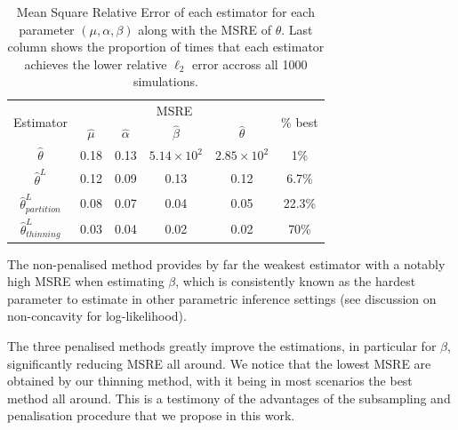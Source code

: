    \begin{table}[!ht]
        \begin{center}  
            \centering
            \begin{tabular}{c|cccc|c}
                \multirow{2}{*}{Estimator} & \multicolumn{4}{c|}{MSRE} & \multirow{2}{*}{$\%$ best}\\
                & $\hat \mu$ & $\hat \alpha$ & $\hat \beta$ & $\hat \theta$ \\
                \midrule
                $\hat \theta$ & 0.18 & 0.13 & $5.14 \times 10^{2}$ & $2.85\times 10^{2}$ & 1\%\\
                $\hat \theta^L$ & 0.12 & 0.09 & 0.13 & 0.12 & 6.7\%\\
                $\hat \theta^L_{partition}$ & 0.08 & 0.07 & 0.04 & 0.05 & 22.3\%\\
                $\hat \theta^L_{thinning}$ & 0.03 & 0.04 & 0.02 & 0.02 & 70\% \\
            \end{tabular}
            \caption{Mean Square Relative Error of each estimator for each parameter $(\mu, \alpha, \beta)$ along with the MSRE of $\theta$.
            Last column shows the proportion of times that each estimator achieves the lower relative $\ell_2$ error accross all 1000 simulations.}
            \label{tab:chap5_subsampling_table}
        \end{center}
    \end{table}

    The non-penalised method provides by far the weakest estimator with a notably high MSRE when estimating $\beta$, which is consistently known as the hardest parameter to estimate in other parametric inference settings (see \textcite{Lemonnier2014} discussion on non-concavity for log-likelihood).

    The three penalised methods greatly improve the estimations, in particular for $\beta$, significantly reducing MSRE all around.
    We notice that the lowest MSRE are obtained by our thinning method, with it being in most scenarios the best method all around. 
    This is a testimony of the advantages of the subsampling and penalisation procedure that we propose in this work.


